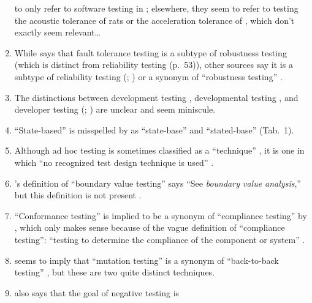 \begin{enumerate}
            to only refer to software testing in \citep[p.~56]{Firesmith2015};
            elsewhere, they seem to refer to testing the acoustic tolerance of
            rats \citep{HolleyEtAl1996} or the acceleration tolerance of
            \accelTolTest{}, which don't exactly seem relevant\dots
      \item While \citeauthor{Firesmith2015} says that fault tolerance testing
            is a subtype of robustness testing
            \citeyearpar[p.~56]{Firesmith2015}
            (which is distinct from reliability testing (p.~53)), other sources
            say it is a subtype of reliability testing (\citealp[p.~375]{IEEE2017};
            \citealp[p.~7-10]{SWEBOK2024}) or a synonym of ``robustness
            testing'' \citepISTQB{}.
      \item The distinctions between development testing \citep[p.~136]{IEEE2017},
            developmental testing \citep[p.~30]{Firesmith2015}, and developer
            testing (\citealp[p.~39]{Firesmith2015}; \citealp[p.~11]{Gerrard2000a})
            are unclear and seem miniscule.
      \item ``State-based'' is misspelled by \citeauthor{Kam2008} as
            ``state-base'' \citeyearpar[pp.~13,~15]{Kam2008} and
            ``stated-base'' (Tab.~1).
      \item Although ad hoc testing is sometimes classified as a ``technique''
            \citep[p.~5-14]{SWEBOK2024}, it is one in which ``no recognized test
            design technique is used'' \citep[p.~42]{Kam2008}.
      \item \citeauthor{Kam2008}'s definition of ``boundary value testing''
            says ``See \emph{boundary value analysis},'' but this definition is
            not present \citeyearpar{Kam2008}.
      \item ``Conformance testing'' is implied to be a synonym of ``compliance
            testing'' by \citeauthor{Kam2008}, which only makes sense because
            of the vague definition of ``compliance testing'': ``testing to
            determine the compliance of the component or system''
            \citeyearpar[p.~43]{Kam2008}.
      \item \citeauthor{Kam2008} seems to imply that ``mutation testing'' is a
            synonym of ``back-to-back testing'' \citeyearpar[p.~46]{Kam2008},
            but these are two quite distinct techniques.
      \item \citeauthor{Kam2008} also says that the goal of negative testing is

\end{enumerate}
